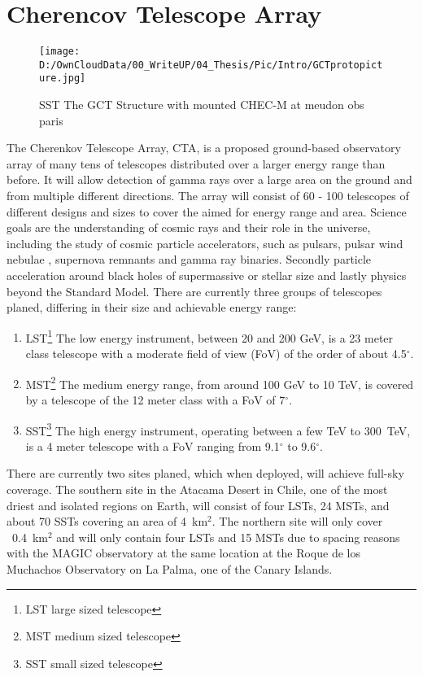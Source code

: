 \documentclass[12pt,article,type=msc,colorback,accentcolor=tud9c]{tudthesis}
\begin{document}


\clearpage
\section{\Large Cherencov Telescope Array}
\label{sec:CTA}

\begin{wrapfigure}{R}{0.5\textwidth}
\centering
\texttt{[image: D:/OwnCloudData/00\_WriteUP/04\_Thesis/Pic/Intro/GCTprotopicture.jpg]}
\caption{\label{fig:GCTStructure}  SST The GCT Structure with mounted CHEC-M at meudon obs paris}
\end{wrapfigure}

The Cherenkov Telescope Array, CTA, is a proposed ground-based observatory array of many tens of telescopes distributed over a larger energy range than before. It will allow detection of gamma rays over a large area on the ground and from multiple different directions. The array will consist of 60 - 100 telescopes of different designs and sizes to cover the aimed for energy range and area. Science goals are the understanding of cosmic rays and their role in the universe, including the study of cosmic particle accelerators, such as pulsars, pulsar wind nebulae , supernova remnants and gamma ray binaries. Secondly particle acceleration around black holes of supermassive or stellar size and lastly physics beyond the Standard Model. 
There are currently three groups of telescopes planed, differing in their size and achievable energy range:\cite{CTADesign}
\begin{enumerate}
\item LST\footnote{LST large sized telescope} The low energy instrument, between 20 and 200 GeV, is a 23 meter class telescope with a moderate field of view (FoV) of the order of about 4.5$^\circ$.
\item MST\footnote{MST medium sized telescope} The medium energy range, from around 100 GeV to 10 TeV, is covered by a telescope of the 12 meter class with a FoV of 7$^\circ$.
\item SST\footnote{SST small sized telescope} The high energy instrument, operating between a few TeV to 300~TeV, is a 4 meter telescope with a FoV ranging from 9.1$^\circ$ to 9.6$^\circ$.
\end{enumerate}
There are currently two sites planed, which when deployed, will achieve full-sky coverage. The southern site in the Atacama Desert in Chile, one of the most driest and isolated regions on Earth, will consist of four LSTs, 24 MSTs, and about 70 SSTs covering an area of 4~km$^2$. The northern site will only cover ~0.4~km$^2$ and will only contain four LSTs and 15 MSTs due to spacing reasons with the MAGIC observatory at the same location at the Roque de los Muchachos Observatory on La Palma, one of the Canary Islands.\\
\end{document}
